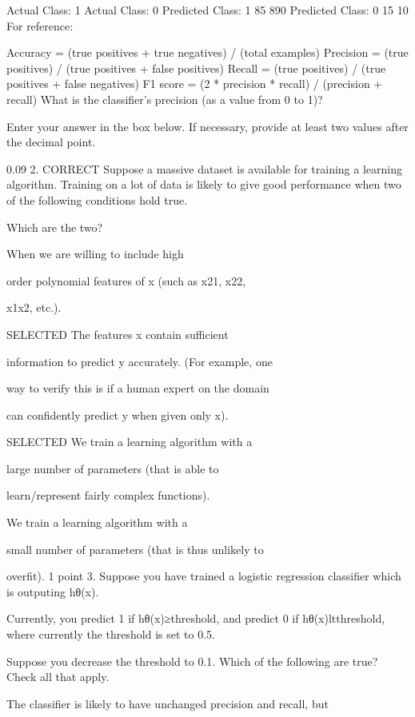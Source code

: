 \documentclass[11pt]{article} %
\begin{document}
Actual Class: 1	Actual Class: 0
Predicted Class: 1	85	890
Predicted Class: 0	15	10
For reference:

Accuracy = (true positives + true negatives) / (total examples)
Precision = (true positives) / (true positives + false positives)
Recall = (true positives) / (true positives + false negatives)
F1 score = (2 * precision * recall) / (precision + recall)
What is the classifier's precision (as a value from 0 to 1)?

Enter your answer in the box below. If necessary, provide at least two values after the decimal point.

0.09
2. CORRECT
Suppose a massive dataset is available for training a learning algorithm. Training on a lot of data is likely to give good performance when two of the following conditions hold true.

Which are the two?


When we are willing to include high

order polynomial features of x (such as x21, x22,

x1x2, etc.).

SELECTED The features x contain sufficient

information to predict y accurately. (For example, one

way to verify this is if a human expert on the domain

can confidently predict y when given only x).


SELECTED  We train a learning algorithm with a

large number of parameters (that is able to

learn/represent fairly complex functions).



We train a learning algorithm with a

small number of parameters (that is thus unlikely to

overfit).
1
point
3. 
Suppose you have trained a logistic regression classifier which is outputing hθ(x).

Currently, you predict 1 if hθ(x)≥threshold, and predict 0 if hθ(x)ltthreshold, where currently the threshold is set to 0.5.

Suppose you decrease the threshold to 0.1. Which of the following are true? Check all that apply.

The classifier is likely to have unchanged precision and recall, but
\end{document}
